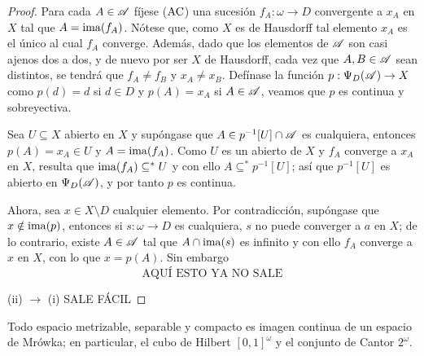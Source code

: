 \begin{proof}
	Para cada $A \in \mathscr{A}$ fíjese ($\operatorname{AC}$) una sucesión $f_A:\omega \to D$ convergente a $x_A$ en $X$ tal que $A=\operatorname{ima}(f_A)$. Nótese que, como $X$ es de Hausdorff tal elemento $x_A$ es el único al cual $f_A$ converge. Además, dado que los elementos de $\mathscr{A}$ son casi ajenos dos a dos, y de nuevo por ser $X$ de Hausdorff, cada vez que $A,B \in \mathscr{A}$ sean distintos, se tendrá que $f_A \neq f_B$ y $x_A \neq x_B$. Defínase la función $p:\Psi_D(\mathscr{A}) \to X$ como $p(d)=d$ si $d \in D$ y $p(A)=x_A$ si $A \in \mathscr{A}$, veamos que $p$ es continua y sobreyectiva.

	Sea $U \subseteq X$ abierto en $X$ y supóngase que $A \in p^{-1}[U] \cap \mathscr{A}$ es cualquiera, entonces $p(A)=x_A \in U$ y $A=\operatorname{ima}(f_A)$. Como $U$ es un abierto de $X$ y $f_A$ converge a $x_A$ en $X$, resulta que $\operatorname{ima}(f_A) \subseteq^* U$ y con ello $A \subseteq^* p^{-1}[U]$; así que $p^{-1}[U]$ es abierto en $\Psi_D(\mathscr{A})$, y por tanto $p$ es continua.

	Ahora, sea $x \in X \setminus D$ cualquier elemento. Por contradicción, supóngase que $x \notin \operatorname{ima}(p)$, entonces si $s:\omega \to D$ es cualquiera, $s$ no puede converger a $a$ en $X$; de lo contrario, existe $A \in \mathscr{A}$ tal que $A \cap \operatorname{ima}(s)$ es infinito y con ello $f_A$ converge a $x$ en $X$, con lo que $x=p(A)$. Sin embargo
	$$ \text{AQUÍ ESTO YA NO SALE} $$

	(ii) $\to$ (i) SALE FÁCIL
\end{proof}

\begin{corolario}
	Todo espacio metrizable, separable y compacto es imagen continua de un espacio de Mrówka; en particular, el cubo de Hilbert $[0,1]^\omega$ y el conjunto de Cantor $2^\omega$.
\end{corolario}